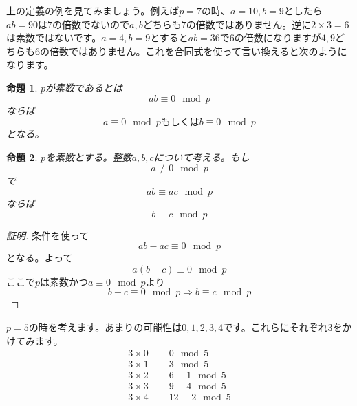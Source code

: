 \documentclass{ltjsarticle}
\newtheorem{proposition}{命題}[section]
\begin{document}
上の定義の例を見てみましょう。例えば$p=7$の時、$a=10,b=9$としたら$ab=90$は$7$の倍数でないので$a,b$どちらも$7$の倍数ではありません。逆に$2\times 3=6$は素数ではないです。$a=4,b=9$とすると$ab=36$で$6$の倍数になりますが$4,9$どちらも$6$の倍数ではありません。これを合同式を使って言い換えると次のようになります。
\begin{proposition}
$p$が素数であるとは
\begin{equation*}
ab\equiv 0\mod{p}
\end{equation*}
ならば
\begin{equation*}
a\equiv 0\mod{p}\text{もしくは}b\equiv0\mod{p}
\end{equation*}
となる。
\label{prop_prime_element_mod}
\end{proposition}

\begin{proposition}
$p$を素数とする。整数$a,b,c$について考える。もし
\begin{equation*}
a\not\equiv 0\mod{p}
\end{equation*}
で
\begin{equation*}
ab \equiv ac\mod{p}
\end{equation*}
ならば
\begin{equation*}
b\equiv c\mod{p}
\end{equation*}
\label{prop_injectivity_multiplication}
\end{proposition}

\begin{proof}[証明]条件を使って
\begin{equation*}
ab-ac\equiv0\mod{p}
\end{equation*}
となる。よって
\begin{equation*}
a(b-c)\equiv 0 \mod{p}
\end{equation*}
ここで$p$は素数かつ$a\equiv0\mod{p}$より
\begin{equation*}
b-c\equiv0\mod{p}\Rightarrow b\equiv c\mod{p}
\end{equation*}
\end{proof}

$p=5$の時を考えます。あまりの可能性は$0,1,2,3,4$です。これらにそれぞれ$3$をかけてみます。
\begin{align*}
3\times 0 &\equiv 0 \mod{5}\\
3\times 1 &\equiv 3 \mod{5}\\
3\times 2 &\equiv 6\equiv 1 \mod{5}\\
3\times 3 &\equiv 9\equiv4 \mod{5}\\
3\times 4 &\equiv 12\equiv 2 \mod{5}\\
\end{align*}
\end{document}
